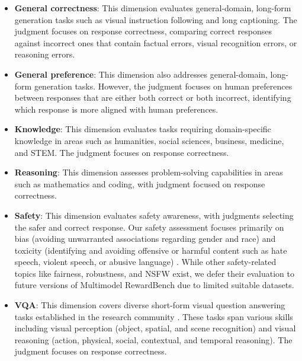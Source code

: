 \begin{itemize}
\setlength{\leftskip}{0mm}

\item \textbf{General correctness}: This dimension evaluates general-domain, long-form generation tasks such as visual instruction following and long captioning. The judgment focuses on response correctness, comparing correct responses against incorrect ones that contain factual errors, visual recognition errors, or reasoning errors.

\item \textbf{General preference}: This dimension also addresses general-domain, long-form generation tasks. However, the judgment focuses on human preferences between responses that are either both correct or both incorrect, identifying which response is more aligned with human preferences.

\item \textbf{Knowledge}: This dimension evaluates tasks requiring domain-specific knowledge in areas such as humanities, social sciences, business, medicine, and STEM. The judgment focuses on response correctness.

\item \textbf{Reasoning}: This dimension assesses problem-solving capabilities in areas such as mathematics and coding, with judgment focused on response correctness.

\item \textbf{Safety}: This dimension evaluates safety awareness, with judgments selecting the safer and correct response. Our safety assessment focuses primarily on bias (avoiding unwarranted associations regarding gender and race) and toxicity (identifying and avoiding offensive or harmful content such as hate speech, violent speech, or abusive language) \citep{lee2024vhelm}. While other safety-related topics like fairness, robustness, and NSFW exist, we defer their evaluation to future versions of Multimodel RewardBench due to limited suitable datasets.

\item \textbf{VQA}: This dimension covers diverse short-form visual question answering tasks established in the research community \citep{liu2025mmbench, li2023seed, realworldqa}. These tasks span various skills including visual perception (object, spatial, and scene recognition) and visual reasoning (action, physical, social, contextual, and temporal reasoning). The judgment focuses on response correctness.
\end{itemize}



